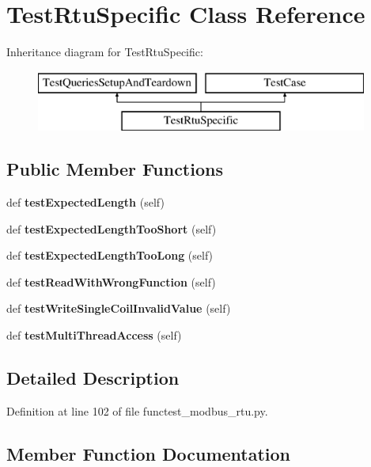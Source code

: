 \section{Test\+Rtu\+Specific Class Reference}
\label{classtests_1_1functest__modbus__rtu_1_1_test_rtu_specific}
Inheritance diagram for Test\+Rtu\+Specific\+:\begin{figure}[H]
\begin{center}
\leavevmode
\includegraphics[height=2.000000cm]{classtests_1_1functest__modbus__rtu_1_1_test_rtu_specific}
\end{center}
\end{figure}
\subsection*{Public Member Functions}
\begin{DoxyCompactItemize}
\item 
def {\bf test\+Expected\+Length} (self)
\item 
def {\bf test\+Expected\+Length\+Too\+Short} (self)
\item 
def {\bf test\+Expected\+Length\+Too\+Long} (self)
\item 
def {\bf test\+Read\+With\+Wrong\+Function} (self)
\item 
def {\bf test\+Write\+Single\+Coil\+Invalid\+Value} (self)
\item 
def {\bf test\+Multi\+Thread\+Access} (self)
\end{DoxyCompactItemize}


\subsection{Detailed Description}


Definition at line 102 of file functest\+\_\+modbus\+\_\+rtu.\+py.



\subsection{Member Function Documentation}
